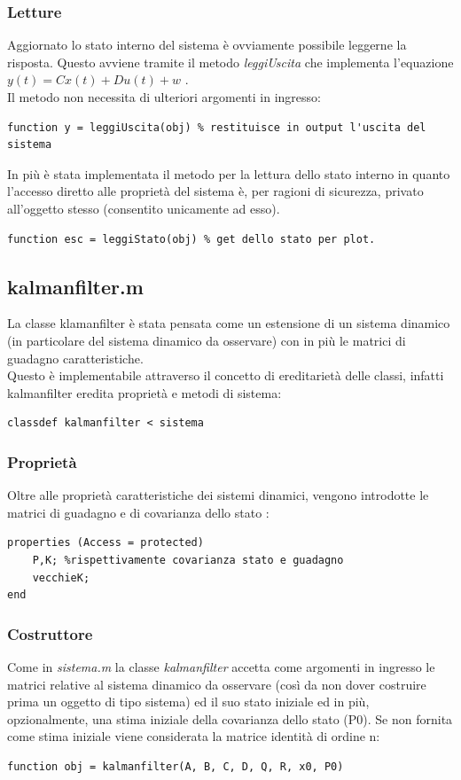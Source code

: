\subsubsection{Letture}
Aggiornato lo stato interno del sistema è ovviamente possibile leggerne la risposta. Questo avviene tramite il metodo \textit{leggiUscita} che implementa l'equazione $y(t) = Cx(t)+Du(t)+w$ .\\
Il metodo non necessita di ulteriori argomenti in ingresso:

\begin{lstlisting}[frame=single]
function y = leggiUscita(obj) % restituisce in output l'uscita del sistema 
\end{lstlisting}

In più è stata implementata il metodo per la lettura dello stato interno in quanto l'accesso diretto alle proprietà del sistema è, per ragioni di sicurezza, privato all'oggetto stesso (consentito unicamente ad esso).
\begin{lstlisting}[frame=single]
function esc = leggiStato(obj) % get dello stato per plot.
\end{lstlisting}

\newpage

\subsection{kalmanfilter.m}
La classe klamanfilter è stata pensata come un estensione di un sistema dinamico (in particolare del sistema dinamico da osservare) con in più le matrici di guadagno caratteristiche.\\
Questo è implementabile attraverso il concetto di ereditarietà delle classi, infatti kalmanfilter eredita proprietà e metodi di sistema:
\begin{lstlisting}[frame=single]
classdef kalmanfilter < sistema 
\end{lstlisting}
\subsubsection{Proprietà}
Oltre alle proprietà caratteristiche dei sistemi dinamici, vengono introdotte le matrici di guadagno e di covarianza dello stato :
\begin{lstlisting}[frame=single]
properties (Access = protected)
	P,K; %rispettivamente covarianza stato e guadagno
	vecchieK;
end
\end{lstlisting}
\subsubsection{Costruttore}
Come in \textit{sistema.m} la classe \textit{kalmanfilter} accetta come argomenti in ingresso le matrici relative al sistema dinamico da osservare (così da non dover costruire prima un oggetto di tipo sistema) ed il suo stato iniziale ed in più, opzionalmente, una stima  iniziale della covarianza dello stato (P0). Se non fornita come stima iniziale viene considerata la matrice identità di ordine n:
\begin{lstlisting}[frame=single]
function obj = kalmanfilter(A, B, C, D, Q, R, x0, P0)
\end{lstlisting}

